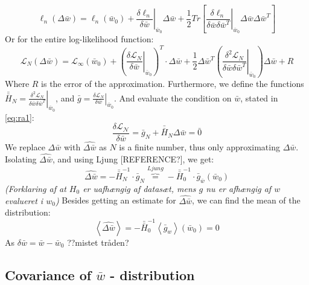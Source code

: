 \begin{equation}
\ell_n(\Delta \bar{w}) = 
\ell_n\left(\bar{w}_0 \right) + 
\left. \frac{\delta \ell_n}{\delta \bar{w}} \right|_{\bar{w}_0} \Delta \bar{w} + 
\frac{1}{2} Tr \left[ \left. \frac{\delta \ell_n}{\delta \bar{w} \delta \bar{w}^T} \right|_{\bar{w}_0} \Delta \bar{w} \Delta \bar{w}^T \right] \label{eq:loglihood-oneObs}
\end{equation}
Or for the entire log-likelihood function:
\begin{equation}
\mathcal{L}_N(\Delta \bar{w}) = 
\mathcal{L}_\infty\left(\bar{w}_0\right) + 
\left(\left.\frac{\delta \mathcal{L}_N}{\delta \bar{w}}\right|_{\bar{w}_0} \right)^T \cdot \Delta \bar{w} +
\frac{1}{2} \Delta \bar{w}^T \left( \left. \frac{\delta^2 \mathcal{L}_N}{\delta \bar{w} \delta \bar{w}^T}\right|_{\bar{w}_0} \right) \Delta \bar{w} + R \label{eq:entireLogLike}
\end{equation}
Where $R$ is the error of the approximation. Furthermore, we define the functions $\bar{\bar{H}}_N = \left. \frac{\delta^2 \mathcal{L}_N}{\delta \bar{w} \delta \bar{w}^T}\right|_{\bar{w}_0}$, and $\bar{g} = \left.\frac{\delta \mathcal{L}_N}{\delta \bar{w}}\right|_{\bar{w}_0}$. And evaluate the condition on $\bar{w}$, stated in \eqref{eq:ra1}:
\begin{equation}
\frac{\delta \mathcal{L_N}}{\delta \bar{w}} = \bar{g}_N+\bar{\bar{H}}_N \Delta \bar{w} = \bar{0}
\end{equation}
We replace $\Delta \bar{w}$ with $\hat{\Delta \bar{w}}$  as $N$ is a finite number, thus only approximating $\Delta \bar{w}$. Isolating $\hat{\Delta \bar{w}}$, and using Ljung [REFERENCE?], we get:
\begin{equation}
\hat{\Delta \bar{w}} = - \bar{\bar{H}}_N^{-1} \cdot \bar{g}_N \overbrace{=}^{Ljung} -\bar{\bar{H}}
_0^{-1} \cdot \bar{g}_{\bar{w}} \left( \bar{w}_0 \right)
\end{equation}
\emph{(Forklaring af at $H_0$ er uafhængig af datasæt, mens $g$ nu er afhængig af $w$ evalueret i $w_0$)}
Besides getting an estimate for $\hat{\Delta \bar{w}}$, we can find the mean of the distribution:
\[
\left\langle \hat{\Delta \bar{w}} \right\rangle = - \bar{\bar{H}}_0^{-1} \left\langle \bar{g}_w \right\rangle (\bar{w}_0) = 0
\]
As $\delta \bar{w} = \bar{w}-\bar{w}_0$ ??mistet tråden?

\subsection{Covariance of $\bar{w}$ - distribution}


